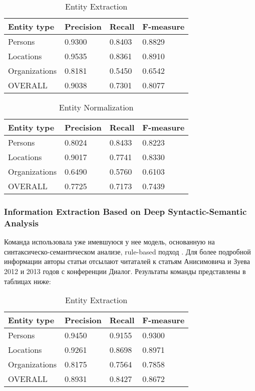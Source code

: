 \begin{table}[ht]
\centering
\caption{Entity Extraction}
\label{factrueval_2_1}
\begin{tabular}{|l|l|l|l|}
\hline
Entity type   & Precision & Recall & F-measure \\ \hline
Persons       & 0.9300    & 0.8403 & 0.8829    \\ \hline
Locations     & 0.9535    & 0.8361 & 0.8910    \\ \hline
Organizations & 0.8181    & 0.5450 & 0.6542    \\ \hline
OVERALL       & 0.9038    & 0.7301 & 0.8077    \\ \hline
\end{tabular}
\end{table}

\begin{table}[ht]
\centering
\caption{Entity Normalization}
\label{factrueval_2_2}
\begin{tabular}{|l|l|l|l|}
\hline
Entity type   & Precision & Recall & F-measure \\ \hline
Persons       & 0.8024    & 0.8433 & 0.8223    \\ \hline
Locations     & 0.9017    & 0.7741 & 0.8330    \\ \hline
Organizations & 0.6490    & 0.5760 & 0.6103    \\ \hline
OVERALL       & 0.7725    & 0.7173 & 0.7439    \\ \hline
\end{tabular}
\end{table}

\subsubsection{Information Extraction Based on Deep Syntactic-Semantic Analysis}

Команда использовала уже имевшуюся у нее модель, основанную на синтаксическо-семантическом анализе, rule-based подход \cite{FactRuEval3}. Для более подробной информации авторы статьи отсылают читаталей к статьям Анисимовича и Зуева 2012 и 2013 годов с конференции Диалог.
Результаты команды представлены в таблицах ниже:


\begin{table}[ht]
\centering
\caption{Entity Extraction}
\label{factrueval_3_1}
\begin{tabular}{|l|l|l|l|}
\hline
Entity type    & Precision      & Recall      & F-measure     \\ \hline
Persons     & 0.9450 & 0.9155 & 0.9300 \\ \hline
Locations     & 0.9261 & 0.8698 & 0.8971 \\ \hline
Organizations     & 0.8175 & 0.7564 & 0.7858 \\ \hline
OVERALL & 0.8931 & 0.8427 & 0.8672 \\ \hline
\end{tabular}
\end{table}

